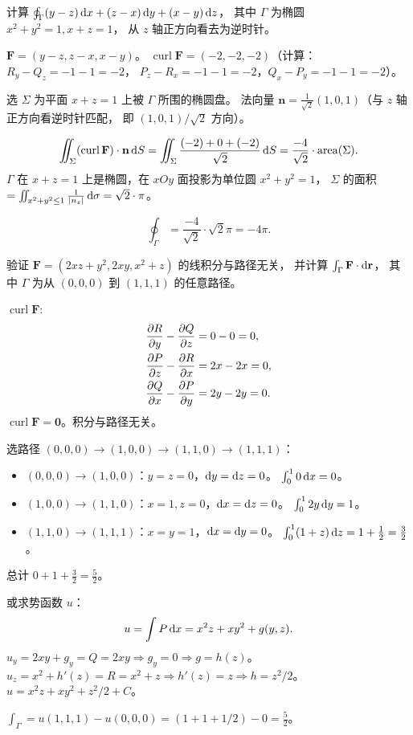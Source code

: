 \documentclass{article}
\DeclareMathOperator{\area}{area}
\DeclareMathOperator{\curl}{curl}
\begin{document}
\begin{exercise}
  计算 $\oint_\Gamma (y-z)\,\mathrm{d} x + (z-x)\,\mathrm{d} y + (x-y)\,\mathrm{d} z$，
  其中 $\Gamma$ 为椭圆 $x^2+y^2=1, x+z=1$，
  从 $z$ 轴正方向看去为逆时针。
\end{exercise}

\begin{solution}
  $\mathbf{F} = (y-z, z-x, x-y)$。
  $\curl\mathbf{F} = (-2, -2, -2)$（计算：$R_y-Q_z = -1-1 = -2$，
  $P_z-R_x = -1-1=-2$，$Q_x-P_y = -1-1=-2$）。

  选 $\Sigma$ 为平面 $x+z=1$ 上被 $\Gamma$ 所围的椭圆盘。
  法向量 $\mathbf{n} = \frac{1}{\sqrt{2}}(1,0,1)$（与 $z$ 轴正方向看逆时针匹配，
  即 $(1,0,1)/\sqrt{2}$ 方向）。

  \[
    \iint_\Sigma (\curl\mathbf{F})\cdot\mathbf{n}\,\dif S
    = \iint_\Sigma \frac{(-2)+0+(-2)}{\sqrt{2}} \,\dif S
    = \frac{-4}{\sqrt{2}} \cdot \area(\Sigma).
  \]
  $\Gamma$ 在 $x+z=1$ 上是椭圆，在 $xOy$ 面投影为单位圆 $x^2+y^2=1$，
  $\Sigma$ 的面积 $= \iint_{x^2+y^2\le 1}\frac{1}{\left| n_z \right|}\,\mathrm{d}\sigma
  = \sqrt{2}\cdot\pi$。

  \[
    \oint_\Gamma = \frac{-4}{\sqrt{2}}\cdot\sqrt{2}\pi = -4\pi.
  \]
\end{solution}

\begin{exercise}[空间路径无关]
  验证 $\mathbf{F} = (2xz+y^2, 2xy, x^2+z)$ 的线积分与路径无关，
  并计算 $\int_\Gamma \mathbf{F}\cdot\mathrm{d}\mathbf{r}$，
  其中 $\Gamma$ 为从 $(0,0,0)$ 到 $(1,1,1)$ 的任意路径。
\end{exercise}

\begin{solution}
  $\curl\mathbf{F}$:
  \begin{align*}
    \frac{\partial R}{\partial y}-\frac{\partial Q}{\partial z} &= 0 - 0 = 0, \\
    \frac{\partial P}{\partial z}-\frac{\partial R}{\partial x} &= 2x - 2x = 0, \\
    \frac{\partial Q}{\partial x}-\frac{\partial P}{\partial y} &= 2y - 2y = 0.
  \end{align*}
  $\curl\mathbf{F} = \mathbf{0}$。积分与路径无关。

  选路径 $(0,0,0) \to (1,0,0) \to (1,1,0) \to (1,1,1)$：
  \begin{itemize}
    \item $(0,0,0) \to (1,0,0)$：$y=z=0$，$\mathrm{d} y = \mathrm{d} z = 0$。
      $\int_0^1 0 \,\mathrm{d} x = 0$。
    \item $(1,0,0) \to (1,1,0)$：$x=1, z=0$，$\mathrm{d} x = \mathrm{d} z = 0$。
      $\int_0^1 2y \,\mathrm{d} y = 1$。
    \item $(1,1,0) \to (1,1,1)$：$x=y=1$，$\mathrm{d} x = \mathrm{d} y = 0$。
      $\int_0^1 (1+z) \,\mathrm{d} z = 1 + \frac{1}{2} = \frac{3}{2}$。
  \end{itemize}
  总计 $0 + 1 + \frac{3}{2} = \frac{5}{2}$。

  或求势函数 $u$：
  \[
    u = \int P\,\mathrm{d} x = x^2 z + xy^2 + g(y,z).
  \]
  $u_y = 2xy + g_y = Q = 2xy \Rightarrow g_y = 0 \Rightarrow g = h(z)$。
  $u_z = x^2 + h'(z) = R = x^2 + z \Rightarrow h'(z) = z \Rightarrow h = z^2/2$。
  $u = x^2 z + xy^2 + z^2/2 + C$。

  $\int_\Gamma = u(1,1,1) - u(0,0,0) = (1+1+1/2) - 0 = \frac{5}{2}$。
\end{solution}
\end{document}
